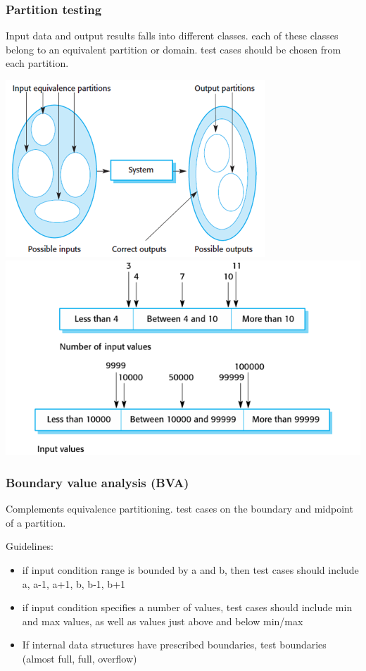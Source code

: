 \documentclass{article}
\begin{document}
    \subsubsection*{Partition testing}

    Input data and output results falls into different classes. each of these classes belong
    to an equivalent partition or domain. test cases should be chosen from each partition.

    \begin{center}
        \includegraphics[scale=0.7]{partition-testing.png}
        \includegraphics[scale=0.6]{equivalence-partitions.png}
    \end{center}

    \subsubsection*{Boundary value analysis (BVA)}

    Complements equivalence partitioning. test cases on the boundary and midpoint of a 
    partition.

    Guidelines:
    \begin{itemize}
        \item if input condition range is bounded by a and b, then test cases should 
        include a, a-1, a+1, b, b-1, b+1
        \item if input condition specifies a number of values, test cases should include 
        min and max values, as well as values just above and below min/max
        \item If internal data structures have prescribed boundaries, test boundaries 
        (almost full, full, overflow)
    \end{itemize}
\end{document}
